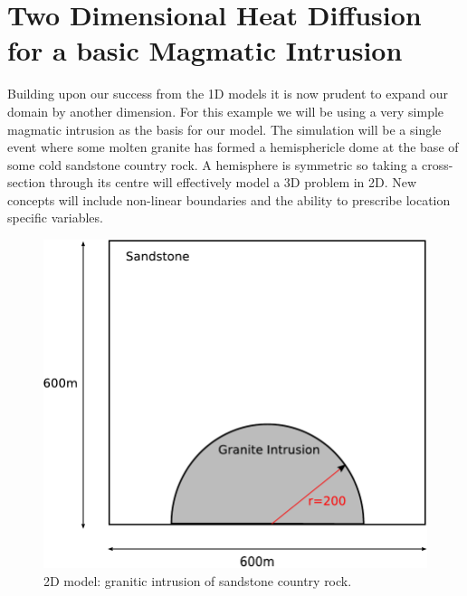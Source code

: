 
%
%
%

\section{Two Dimensional Heat Diffusion for a basic Magmatic Intrusion}
 Building upon our success from the 1D models it is now prudent to expand our domain by another dimension. For this example we will be using a very simple magmatic intrusion as the basis for our model. The simulation will be a single event where some molten granite has formed a hemisphericle dome at the base of some cold sandstone country rock. A hemisphere is symmetric so taking a cross-section through its centre will effectively model a 3D problem in 2D. New concepts will include non-linear boundaries and the ability to prescribe location specific variables.

\begin{figure}[h!]
\centerline{\includegraphics[width=4.in]{figures/twodheatdiff}}
\caption{2D model: granitic intrusion of sandstone country rock.}
\label{fig:twodhdmodel}
\end{figure}

